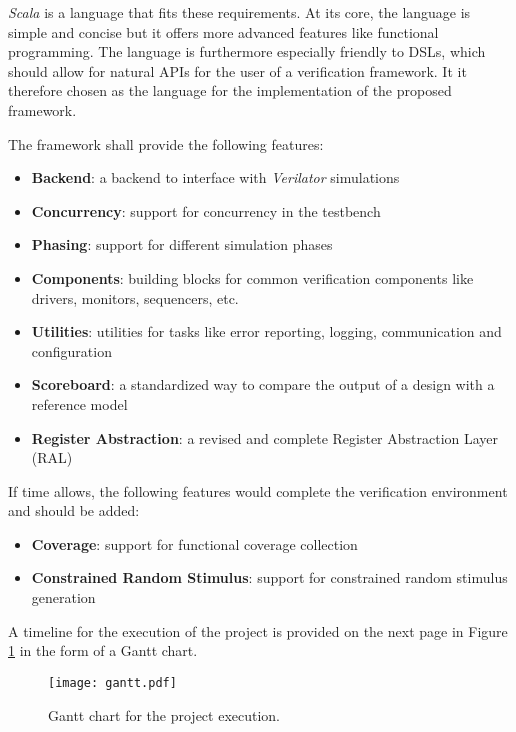 \documentclass[11pt]{article}
\begin{document}
\textit{Scala} is a language that fits these requirements. At its core, the language is simple and concise but it offers more advanced features like functional programming. The language is furthermore especially friendly to DSLs, which should allow for natural APIs for the user of a verification framework. It it therefore chosen as the language for the implementation of the proposed framework.


\noindent The framework shall provide the following features:

\begin{itemize}
    \item \textbf{Backend}: a backend to interface with \textit{Verilator} simulations
    \item \textbf{Concurrency}: support for concurrency in the testbench
    \item \textbf{Phasing}: support for different simulation phases
    \item \textbf{Components}: building blocks for common verification components like drivers, monitors, sequencers, etc.
    \item \textbf{Utilities}: utilities for tasks like error reporting, logging, communication and configuration
    \item \textbf{Scoreboard}: a standardized way to compare the output of a design with a reference model
    \item \textbf{Register Abstraction}: a revised and complete Register Abstraction Layer (RAL)
\end{itemize}

\noindent If time allows, the following features would complete the verification environment and should be added:

\begin{itemize}
    \item \textbf{Coverage}: support for functional coverage collection
    \item \textbf{Constrained Random Stimulus}: support for constrained random stimulus generation
\end{itemize}

\noindent A timeline for the execution of the project is provided on the next page in Figure \ref{fig:gantt} in the form of a Gantt chart.

\begin{landscape}
    \pagestyle{empty}%
    \begin{figure}
        \hspace{-2.5cm}
        \texttt{[image: gantt.pdf]}
        \caption{Gantt chart for the project execution.}
        \label{fig:gantt}
\end{figure}
\end{landscape}


\printbibliography
\end{document}
